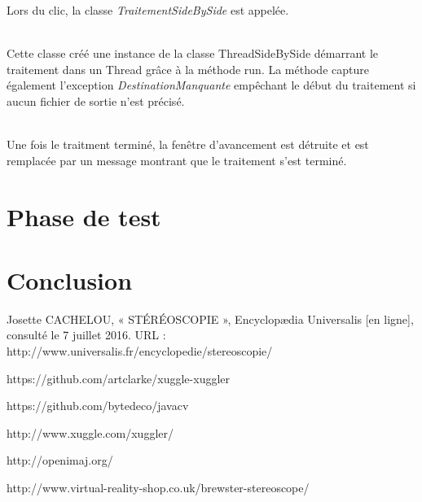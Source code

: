 \documentclass[10pt,a4paper]{article}
\begin{document}
Lors du clic, la classe \textit{TraitementSideBySide} est appelée.


~~\\

Cette classe créé une instance de la classe ThreadSideBySide démarrant le traitement dans un Thread grâce à la méthode run. La méthode capture également l'exception \textit{DestinationManquante} empêchant
le début du traitement si aucun fichier de sortie n'est précisé.


~~\\

Une fois le traitment terminé, la fenêtre d'avancement est détruite et est remplacée par un message montrant que le traitement s'est terminé.


\section{Phase de test}

\section{Conclusion}

Josette CACHELOU, « STÉRÉOSCOPIE  », Encyclopædia Universalis [en ligne], consulté le 7 juillet 2016. URL : http://www.universalis.fr/encyclopedie/stereoscopie/

https://github.com/artclarke/xuggle-xuggler

https://github.com/bytedeco/javacv

http://www.xuggle.com/xuggler/

http://openimaj.org/

http://www.virtual-reality-shop.co.uk/brewster-stereoscope/
\end{document}
